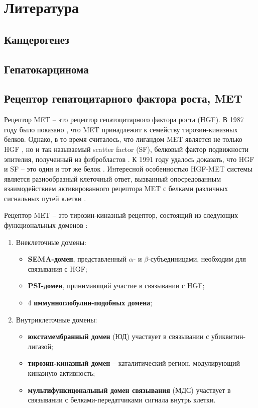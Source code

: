 \section{Литература}

\subsection{Канцерогенез}



\subsection{Гепатокарцинома}

\subsection{Рецептор гепатоцитарного фактора роста, MET}

Рецептор MET -- это рецептор гепатоцитарного фактора роста (HGF). В 1987 году было показано \cite{park_sequence_1987}, что MET принадлежит к семейству тирозин-киназных белков. Однако, в то время считалось, что лигандом MET является не только HGF \cite{nakamura_molecular_1989}, но и так называемый scatter factor (SF), белковый фактор подвижности эпителия, полученный из фибробластов \cite{stoker_scatter_1987}. К 1991 году удалось доказать, что HGF и SF -- это один и тот же белок \cite{weidner_evidence_1991}. Интересной особенностью HGF-MET системы является разнообразный клеточный ответ, вызванный опосредованным взаимодействием активированного рецептора MET с белками различных сигнальных путей клетки \cite{trusolino_met_2010}.

Рецептор MET -- это тирозин-киназный рецептор, состоящий из следующих функциональных доменов \cite{trusolino_met_2010}:
\begin{enumerate}
	\item Внеклеточные домены:
	\begin{itemize}
		\item \textbf{SEMA-домен}, представленный $\alpha$- и $\beta$-субъединицами, необходим для связывания с HGF;
		\item \textbf{PSI-домен}, принимающий участие в связывании с HGF;
		\item 4 \textbf{иммунноглобулин-подобных домена};
	\end{itemize} 
	\item Внутриклеточные домены:
		\begin{itemize}
		\item \textbf{юкстамембранный домен} (ЮД) участвует в связывании с убиквитин-лигазой;
		\item \textbf{тирозин-киназный домен} -- каталитический регион, модулирующий киназную активность;
		\item \textbf{мультифункицональный домен связывания} (МДС) участвует в связывании с белками-передатчиками сигнала внутрь клетки.
	\end{itemize} 
\end{enumerate}

